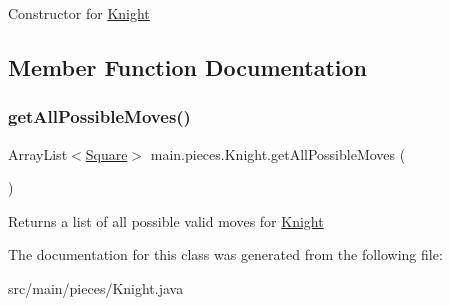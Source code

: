 Constructor for \hyperlink{classmain_1_1pieces_1_1_knight}{Knight} 

\subsection{Member Function Documentation}
\mbox{\label{classmain_1_1pieces_1_1_knight_a4be7cb2952921d36d8020971fd451724}} 
\subsubsection{\texorpdfstring{get\+All\+Possible\+Moves()}{getAllPossibleMoves()}}
{\footnotesize\ttfamily Array\+List$<$\hyperlink{classmain_1_1_square}{Square}$>$ main.\+pieces.\+Knight.\+get\+All\+Possible\+Moves (\begin{DoxyParamCaption}{ }\end{DoxyParamCaption})\hspace{0.3cm}{\ttfamily [inline]}}

Returns a list of all possible valid moves for \hyperlink{classmain_1_1pieces_1_1_knight}{Knight} 

The documentation for this class was generated from the following file\+:\begin{DoxyCompactItemize}
\item 
src/main/pieces/Knight.\+java\end{DoxyCompactItemize}
